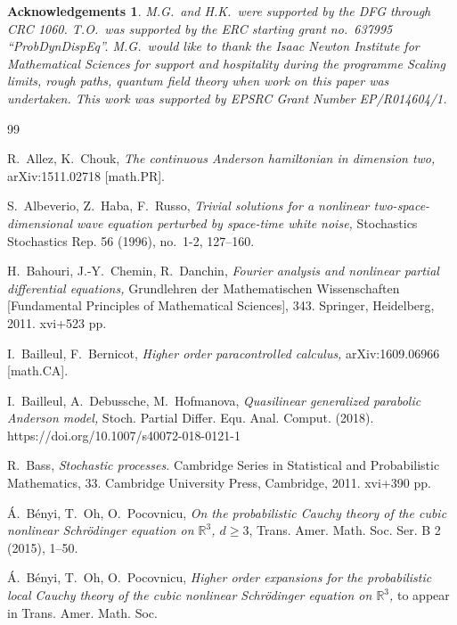 \documentclass[%
11pt,  reqno]{amsart}
\newcommand{\1}{\hspace{0.2mm}\text{I}\hspace{0.2mm}}
\newcommand{\R}{\mathbb{R}}
\newtheorem*{ackno}{Acknowledgements}
\numberwithin{equation}{section}
\numberwithin{theorem}{section}
\begin{document}
\begin{ackno}\rm
M.G.~and H.K.~were supported by the DFG through CRC 1060.
T.O.~was supported by the ERC starting grant 
no.~637995 ``ProbDynDispEq''.
M.G.~would like to thank the Isaac Newton Institute for Mathematical Sciences for support and hospitality during the programme Scaling limits, rough paths, quantum field theory when work on this paper was undertaken.  This work was supported by EPSRC Grant Number EP/R014604/1.

\end{ackno}




\begin{thebibliography}{99}


R.~Allez, K.~Chouk,
{\it The continuous {Anderson} hamiltonian in dimension two,}
arXiv:1511.02718 [math.PR].



S.~Albeverio, Z.~Haba, F.~Russo, 
{\it Trivial solutions for a nonlinear two-space-dimensional wave equation perturbed by space-time white noise,} Stochastics Stochastics Rep.  56 (1996), no.~1-2, 127--160. 

H.~Bahouri, J.-Y.~Chemin, 
R.~Danchin, 
{\it Fourier analysis and nonlinear partial differential equations,}
Grundlehren der Mathematischen Wissenschaften [Fundamental Principles of Mathematical Sciences], 
343. Springer, Heidelberg, 2011. xvi+523 pp. 

I.~Bailleul,  F.~Bernicot,
{\it Higher order paracontrolled calculus,}
arXiv:1609.06966 [math.CA].


I.~Bailleul, A.~Debussche,  M.~Hofmanova,
{\it Quasilinear generalized parabolic {Anderson} model,}
 Stoch. Partial Differ. Equ. Anal. Comput. (2018). 
 https://doi.org/10.1007/s40072-018-0121-1


R.~Bass, 
{\it Stochastic processes.}
Cambridge Series in Statistical and Probabilistic Mathematics, 33. Cambridge University Press, Cambridge, 2011. xvi+390 pp. 




\'A.~B\'enyi, T.~Oh, O.~Pocovnicu,
{\it On the probabilistic Cauchy theory of the cubic nonlinear Schr\"odinger equation on 
$\R^3$, $d\geq 3$}, Trans. Amer. Math. Soc. Ser. B  2 (2015), 1--50. 


\'A.~B\'enyi, T.~Oh, O.~Pocovnicu,
{\it Higher order expansions for the probabilistic local Cauchy theory of the cubic nonlinear Schr\"odinger equation on $\R^3$,}
to appear in Trans. Amer. Math. Soc.





\end{thebibliography}
\end{document}

